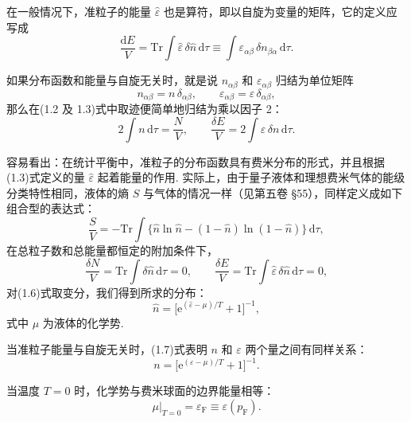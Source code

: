 在一般情况下，准粒子的能量 $\hat\varepsilon$ 也是算符，即以自旋为变量的矩阵，它的定义应写成
\begin{equation}
\frac{\mathrm{d}E}{V}=\mathrm{Tr}\int\hat\varepsilon\,\delta\hat n\,\mathrm{d}\tau\equiv\int\varepsilon_{\alpha\beta}\,\delta n_{\beta\alpha}\,\mathrm{d}\tau.
\end{equation}

如果分布函数和能量与自旋无关时，就是说 $n_{\alpha\beta}$ 和 $\varepsilon_{\alpha\beta}$ 归结为单位矩阵
\begin{equation}
n_{\alpha\beta}=n\,\delta_{\alpha\beta},\qquad \varepsilon_{\alpha\beta}=\varepsilon\,\delta_{\alpha\beta},
\end{equation}
那么在(1.2 及 1.3)式中取迹便简单地归结为乘以因子 2：
\begin{equation}
2\int n\,\mathrm{d}\tau=\frac{N}{V},\qquad \frac{\delta E}{V}=2\int\varepsilon\,\delta n\,\mathrm{d}\tau.
\end{equation}

容易看出：在统计平衡中，准粒子的分布函数具有费米分布的形式，并且根据(1.3)式定义的量 $\hat\varepsilon$ 起着能量的作用. 实际上，由于量子液体和理想费米气体的能级分类特性相同，液体的熵 $S$ 与气体的情况一样（见第五卷 §55），同样定义成如下组合型的表达式：
\begin{equation}
\frac{S}{V}=-\mathrm{Tr}\int\bigl\{\hat n\ln\hat n-(1-\hat n)\ln(1-\hat n)\bigr\}\,\mathrm{d}\tau,
\end{equation}
在总粒子数和总能量都恒定的附加条件下，
\begin{equation*}
\frac{\delta N}{V}=\mathrm{Tr}\int\delta\hat n\,\mathrm{d}\tau=0,\qquad \frac{\delta E}{V}=\mathrm{Tr}\int\hat\varepsilon\,\delta\hat n\,\mathrm{d}\tau=0,
\end{equation*}
对(1.6)式取变分，我们得到所求的分布：
\begin{equation}
\hat n=\bigl[\mathrm{e}^{(\hat\varepsilon-\mu)/T}+1\bigr]^{-1},
\end{equation}
式中 $\mu$ 为液体的化学势.

当准粒子能量与自旋无关时，(1.7)式表明 $n$ 和 $\varepsilon$ 两个量之间有同样关系：
\begin{equation}
n=\bigl[\mathrm{e}^{(\varepsilon-\mu)/T}+1\bigr]^{-1}.
\end{equation}

当温度 $T=0$ 时，化学势与费米球面的边界能量相等：
\begin{equation}
\mu\big|_{T=0}=\varepsilon_{\mathrm F}\equiv\varepsilon(p_{\mathrm F}).
\end{equation}

